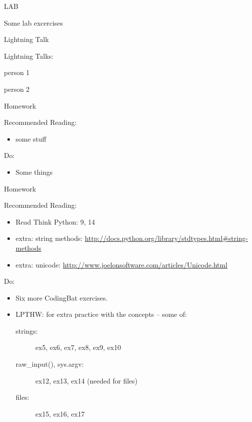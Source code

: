 \documentclass{beamer}
\begin{document}
\begin{frame}{LAB}

\vfill
{\large Some lab excercises}
\vfill

\end{frame}


\begin{frame}{Lightning Talk}

{\LARGE Lightning Talks:}

\vfill
{\large person 1}

\vfill
{\large person 2}

\end{frame}


\begin{frame}[fragile]{Homework}

Recommended Reading:
\begin{itemize}
  \item some stuff
\end{itemize}

Do:
\begin{itemize}
    \item Some things    
\end{itemize}

\end{frame}

\begin{frame}[fragile]{Homework}

Recommended Reading:
\begin{itemize}
  \item Read Think Python: 9, 14
  \item extra: string methods: \url{http://docs.python.org/library/stdtypes.html#string-methods}
  \item extra: unicode: \url{http://www.joelonsoftware.com/articles/Unicode.html}
\end{itemize}

Do:
\begin{itemize}
    \item Six more CodingBat exercises. 
    \item LPTHW: for extra practice with the concepts -- some of:
    \begin{description}
        \item[strings:] ex5, ex6, ex7, ex8, ex9, ex10
        \item[raw\_input(), sys.argv:] ex12, ex13, ex14 (needed for files)
        \item[files:] ex15, ex16, ex17 
    \end{description}    
\end{itemize}

\end{frame}
\end{document}
